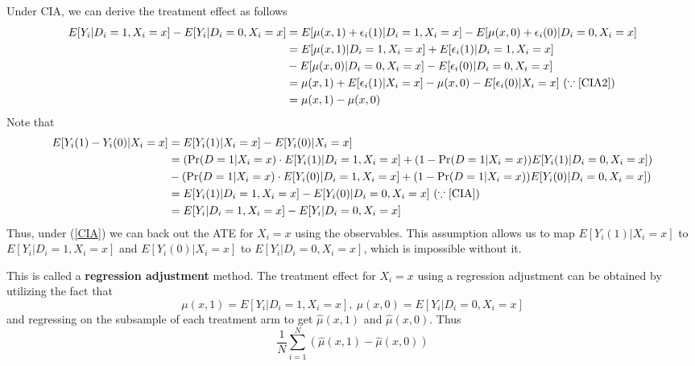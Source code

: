 \documentclass[12pt]{article}
\theoremstyle{definition}
\theoremstyle{property}
\theoremstyle{assumption}
\theoremstyle{example}
\theoremstyle{comment}
\begin{document}
Under CIA, we can derive the treatment effect as follows
\footnotesize{\begin{align*}
E[Y_i|D_i=1, X_i=x]-E[Y_i|D_i=0, X_i=x]&=E[\mu(x,1)+\epsilon_i(1)|D_i=1, X_i=x]-E[\mu(x,0)+\epsilon_i(0)|D_i=0, X_i=x]\\
&=E[\mu(x,1)|D_i=1, X_i=x]+E[\epsilon_i(1)|D_i=1, X_i=x]\\
&-E[\mu(x,0)|D_i=0, X_i=x]-E[\epsilon_i(0)|D_i=0, X_i=x]\\
&=\mu(x,1)+E[\epsilon_i(1)|X_i=x]-\mu(x,0)-E[\epsilon_i(0)|X_i=x] \ (\because \ref{CIA2})\\
&=\mu(x,1)-\mu(x,0)
\end{align*}}\normalsize
Note that 
\footnotesize{\begin{align*}
E[Y_i(1)-Y_i(0)|X_i=x] &= E[Y_i(1)|X_i=x]- E[Y_i(0)|X_i=x]\\
&=(\Pr(D=1|X_i=x)\cdot E[Y_i(1)|D_i=1,X_i=x]+(1-\Pr(D=1|X_i=x))E[Y_i(1)|D_i=0,X_i=x])\\
&-(\Pr(D=1|X_i=x)\cdot E[Y_i(0)|D_i=1,X_i=x]+(1-\Pr(D=1|X_i=x))E[Y_i(0)|D_i=0,X_i=x])\\
&=  E[Y_i(1)|D_i=1,X_i=x]- E[Y_i(0)|D_i=0,X_i=x] \ (\because \ref{CIA}) \\
&=  E[Y_i|D_i=1, X_i=x]-E[Y_i|D_i=0, X_i=x]
\end{align*}}\normalsize
Thus, under (\ref{CIA}) we can back out the ATE for $X_i=x$ using the observables. This assumption allows us to map $ E[Y_i(1)|X_i=x]$ to $ E[Y_i|D_i=1, X_i=x]$ and $E[Y_i(0)|X_i=x]$ to $ E[Y_i|D_i=0, X_i=x]$, which is impossible without it. \par
This is called a \textbf{regression adjustment} method. The treatment effect for $X_i=x$ using a regression adjustment can be obtained by utilizing the fact that 
\[
\mu(x,1)=E[Y_i|D_i=1, X_i=x], \ \mu(x,0)=E[Y_i|D_i=0, X_i=x]
\]
and regressing on the subsample of each treatment arm to get $\hat{\mu}(x,1)$ and $\hat{\mu}(x,0)$. Thus
\[
\frac{1}{N}\sum_{i=1}^N(\hat{\mu}(x,1)-\hat{\mu}(x,0))
\]
\end{document}
